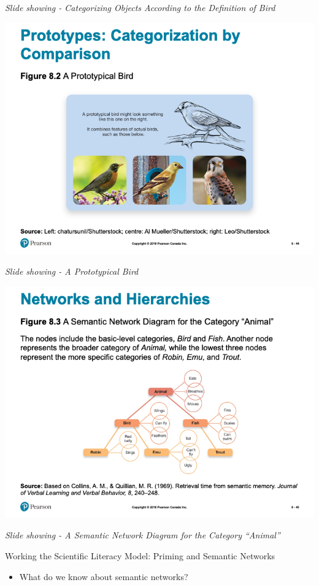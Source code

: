 \documentclass[
]{book}
\providecommand{\tightlist}{%
  \setlength{\itemsep}{0pt}\setlength{\parskip}{0pt}}
\begin{document}
\begin{reflect}
\emph{Slide showing - Categorizing Objects According to the Definition of Bird}

\includegraphics{assets/unit_1/slide_44.png}

\emph{Slide showing - A Prototypical Bird}

\includegraphics{assets/unit_1/slide_45.png}

\emph{Slide showing - A Semantic Network Diagram for the Category ``Animal''}

Working the Scientific Literacy Model: Priming and Semantic
Networks

\begin{itemize}
\tightlist
\item
  What do we know about semantic networks?


\end{itemize}
\end{reflect}
\end{document}
